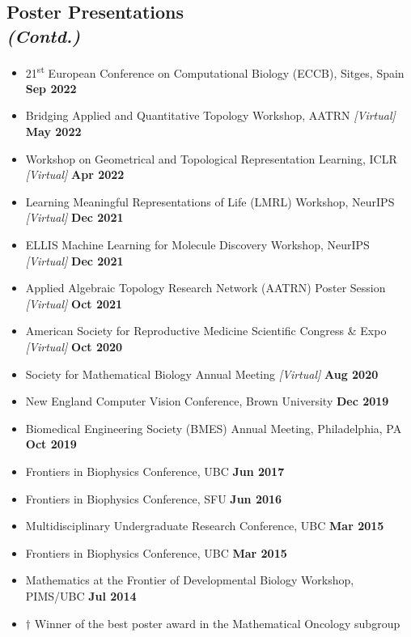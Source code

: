 \documentclass[margin,line]{res}
\begin{document}
\begin{resume}
\section{\sc Poster Presentations\\ \textit{(Contd.)}}
{\renewcommand\leftmargini{0em}
\begin{itemize}
\setlength\itemsep{0.3em}
\item[] 21\textsuperscript{st} European Conference on Computational Biology (ECCB), Sitges, Spain \hfill {\bf Sep 2022}
\item[] Bridging Applied and Quantitative Topology Workshop, AATRN \textit{[Virtual]} \hfill {\bf May 2022}
\item[] Workshop on Geometrical and Topological Representation Learning, ICLR \textit{[Virtual]} \hfill {\bf Apr 2022} 
\item[] Learning Meaningful Representations of Life (LMRL) Workshop, NeurIPS \textit{[Virtual]} \hfill {\bf Dec 2021}
\item[] ELLIS Machine Learning for Molecule Discovery Workshop, NeurIPS \textit{[Virtual]} \hfill {\bf Dec 2021}
\item[] Applied Algebraic Topology Research Network (AATRN) Poster Session \textit{[Virtual]} \hfill {\bf Oct 2021}
\item[] American Society for Reproductive Medicine Scientific Congress \& Expo \textit{[Virtual]} \hfill {\bf Oct 2020}
\item[] Society for Mathematical Biology Annual Meeting\textsuperscript{\textdagger} \textit{[Virtual]} \hfill {\bf Aug 2020}
\item[] New England Computer Vision Conference, Brown University \hfill {\bf Dec 2019}
\item[] Biomedical Engineering Society (BMES) Annual Meeting, Philadelphia, PA \hfill {\bf Oct 2019}
\item[] Frontiers in Biophysics Conference, UBC \hfill {\bf Jun 2017}
\item[] Frontiers in Biophysics Conference, SFU \hfill {\bf Jun 2016}
\item[] Multidisciplinary Undergraduate Research Conference, UBC \hfill {\bf Mar 2015}
\item[] Frontiers in Biophysics Conference, UBC \hfill {\bf Mar 2015}
\item[] Mathematics at the Frontier of Developmental Biology Workshop, PIMS/UBC \hfill {\bf Jul 2014}
\item[] $\dagger$ Winner of the best poster award in the Mathematical Oncology subgroup


\end{itemize}}
\end{resume}
\end{document}

